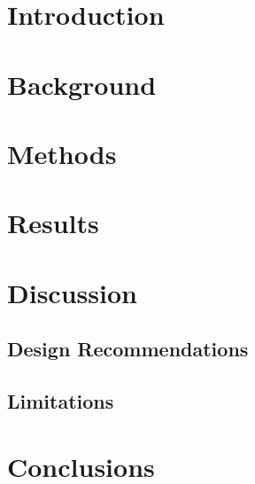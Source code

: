 \documentclass[manuscript,review]{acmart}
\begin{document}
\section{Introduction}

\section{Background}

\section{Methods}

\section{Results}

\lipsum[1-40]

\section{Discussion}

\subsection{Design Recommendations}

\subsection{Limitations}

\section{Conclusions}




\end{document}
